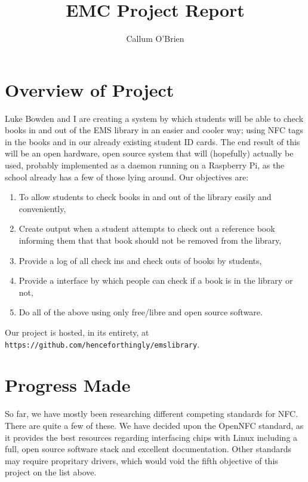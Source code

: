\documentclass{article}
\begin{document}
\title{EMC Project Report}
\author{Callum O'Brien}
\maketitle

\section{Overview of Project}

Luke Bowden and I are creating a system by which students will be able to check books in and out of the EMS library in an easier and cooler way; using NFC tags in the books and in our already existing student ID cards. The end result of this will be an open hardware, open source system that will (hopefully) actually be used, probably implemented as a daemon running on a Raspberry Pi, as the school already has a few of those lying around. Our objectives are:\begin{enumerate}

    \item To allow students to check books in and out of the library easily and conveniently,

    \item Create output when a student attempts to check out a reference book informing them that that book should not be removed from the library,

    \item Provide a log of all check ins and check outs of books by students,

    \item Provide a interface by which people can check if a book is in the library or not,

    \item Do all of the above using only free/libre and open source software.

\end{enumerate} Our project is hosted, in its entirety, at \verb!https://github.com/henceforthingly/emslibrary!.

\section{Progress Made}

So far, we have mostly been researching different competing standards for NFC. There are quite a few of these. We have decided upon the OpenNFC standard, as it provides the best resources regarding interfacing chips with Linux including a full, open source software stack and excellent documentation. Other standards may require propritary drivers, which would void the fifth objective of this project on the list above.
\end{document}
